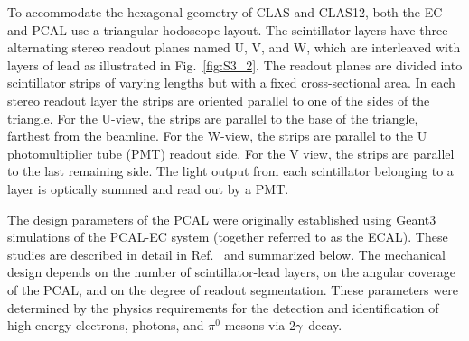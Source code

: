 To accommodate the hexagonal geometry of CLAS and CLAS12, both the EC and PCAL use a triangular hodoscope
layout. The scintillator layers have three alternating stereo readout planes named U, V, and W, which are
interleaved with layers of lead as illustrated in Fig.~\ref{fig:S3_2}. The readout planes are divided into
scintillator strips of varying lengths but with a fixed cross-sectional area. In each stereo readout layer the strips
are oriented parallel to one of the sides of the triangle. For the U-view, the strips are parallel to the base of the
triangle, farthest from the beamline. For the W-view, the strips are parallel to the U photomultiplier tube (PMT)
readout side. For the V view, the strips are parallel to the last remaining side.  The light output from each
scintillator belonging to a layer is optically summed and read out by a PMT.

The design parameters of the PCAL were originally established using Geant3 simulations of the PCAL-EC system
(together referred to as the ECAL). These studies are described in detail in Ref.~\cite{2007001} and
summarized below. The mechanical design depends on the number of scintillator-lead layers, on the angular
coverage of the PCAL, and on the degree of readout segmentation. These parameters were determined by
the physics requirements for the detection and identification of high energy electrons, photons, and $\pi^{0}$
mesons via $2\gamma$\ decay.

